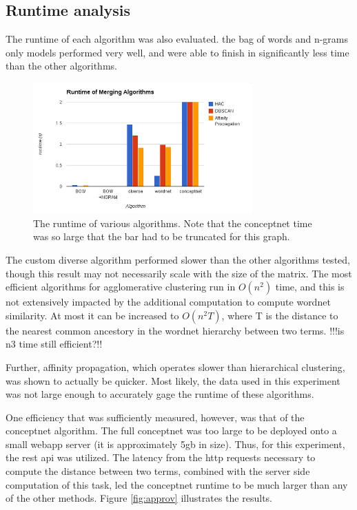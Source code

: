 \subsection{Runtime analysis}

The runtime of each algorithm was also evaluated.
the bag of words and n-grams only models performed very well, and were able to finish in significantly less time than the other algorithms.
\begin{figure}
	\begin{center}
	\includegraphics[width=0.75\textwidth]{figures/rtchart.png}
	\caption{The runtime of various algorithms. Note that the conceptnet time was so large that the bar had to be truncated for this graph.}
	\label{fig:s}
	\end{center}
\end{figure}

The custom diverse algorithm performed slower than the other algorithms tested, though this result may not necessarily scale with the size of the matrix. 
The most efficient algorithms for agglomerative clustering run in $O(n^2)$ time, and this is not extensively impacted by the additional computation to compute wordnet similarity.
At most it can be increased to $O(n^2T)$, where T is the distance to the nearest common ancestory in the wordnet hierarchy between two terms. !!!is n3 time still efficient?!!

Further, affinity propagation, which operates slower than hierarchical clustering, was shown to actually be quicker.
Most likely, the data used in this experiment was not large enough to accurately gage the runtime of these algorithms.

One efficiency that was sufficiently measured, however, was that of the conceptnet algorithm.
The full conceptnet was too large to be deployed onto a small webapp server (it is approximately 5gb in size). 
Thus, for this experiment, the rest api was utilized. 
The latency from the http requests necessary to compute the distance between two terms, combined with the server side computation of this task, led the conceptnet runtime to be much larger than any of the other methods.
Figure \ref{fig:approv} illustrates the results.

